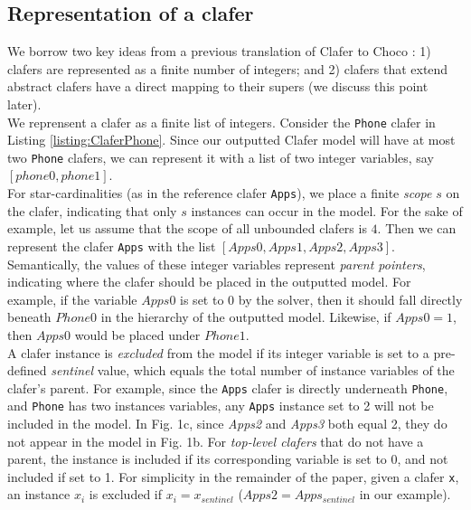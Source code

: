 \documentclass{easychair}
\begin{document}
\subsection{Representation of a clafer}
\label{representation}
We borrow two key ideas from a previous translation of Clafer to Choco \cite{jimmy}: 1) clafers are represented as a finite number of integers; and 2) clafers that extend abstract clafers have a direct mapping to their supers (we discuss this point later).\\
\indent We reprensent a clafer as a finite list of integers. Consider the \texttt{Phone} clafer in Listing \ref{listing:ClaferPhone}. Since our outputted Clafer model will have at most two \texttt{Phone} clafers, we can represent it with a list of two integer variables, say $[phone0, phone1]$.  \\
\indent For star-cardinalities (as in the reference clafer \texttt{Apps}), we place a finite \textit{scope} $s$ on the clafer, indicating that only $s$ instances can occur in the model. For the sake of example, let us assume that the scope of all unbounded clafers is $4$. Then we can represent the clafer \texttt{Apps} with the list $[Apps0, Apps1, Apps2, Apps3]$.\\
\indent Semantically, the values of these integer variables represent \textit{parent pointers}, indicating where the clafer should be placed in the outputted model. For example, if the variable $Apps0$ is set to $0$ by the solver, then it should fall directly beneath $Phone0$ in the hierarchy of the outputted model. Likewise, if $Apps0 = 1$, then $Apps0$ would be placed under $Phone1$.\\
\indent A clafer instance is \textit{excluded} from the model if its integer variable is set to a pre-defined \textit{sentinel} value, which equals the total number of instance variables of the clafer's parent. For example, since the \texttt{Apps} clafer is directly underneath \texttt{Phone}, and \texttt{Phone} has two instances variables, any \texttt{Apps} instance set to 2 will not be included in the model. In Fig. 1c, since \textit{Apps2} and \textit{Apps3} both equal 2, they do not appear in the model in Fig. 1b. For \textit{top-level clafers} that do not have a parent, the instance is included if its corresponding variable is set to 0, and not included if set to 1. For simplicity in the remainder of the paper, given a clafer \texttt{x}, an instance \textit{$x_i$} is excluded if  $x_i = x_{sentinel}$ ($Apps2 = Apps_{sentinel}$ in our example). \\
\end{document}
